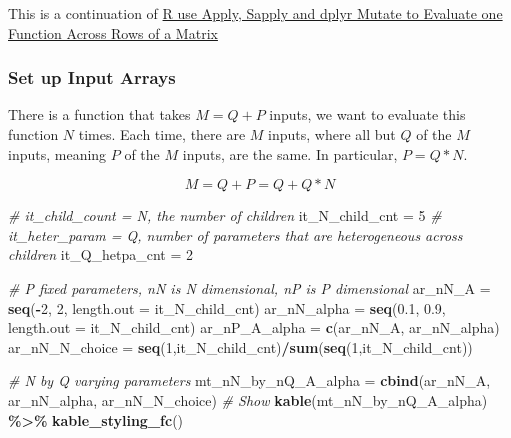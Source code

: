 \documentclass[
]{book}
\newenvironment{Shaded}{\begin{snugshade}}{\end{snugshade}}
\newcommand{\CommentTok}[1]{\textcolor[rgb]{0.56,0.35,0.01}{\textit{#1}}}
\newcommand{\DataTypeTok}[1]{\textcolor[rgb]{0.13,0.29,0.53}{#1}}
\newcommand{\DecValTok}[1]{\textcolor[rgb]{0.00,0.00,0.81}{#1}}
\newcommand{\FloatTok}[1]{\textcolor[rgb]{0.00,0.00,0.81}{#1}}
\newcommand{\KeywordTok}[1]{\textcolor[rgb]{0.13,0.29,0.53}{\textbf{#1}}}
\newcommand{\NormalTok}[1]{#1}
\newcommand{\OperatorTok}[1]{\textcolor[rgb]{0.81,0.36,0.00}{\textbf{#1}}}
\newcommand{\StringTok}[1]{\textcolor[rgb]{0.31,0.60,0.02}{#1}}
\begin{document}
This is a continuation of \href{https://fanwangecon.github.io/R4Econ/function/noloop/fs_applysapplymutate.html}{R use Apply, Sapply and dplyr Mutate to Evaluate one Function Across Rows of a Matrix}

\hypertarget{set-up-input-arrays}{%
\subsubsection{Set up Input Arrays}\label{set-up-input-arrays}}

There is a function that takes \(M=Q+P\) inputs, we want to evaluate this function \(N\) times. Each time, there are \(M\) inputs, where all but \(Q\) of the \(M\) inputs, meaning \(P\) of the \(M\) inputs, are the same. In particular, \(P=Q*N\).

\[M = Q+P = Q + Q*N\]

\begin{Shaded}
\begin{Highlighting}[]
\CommentTok{\# it\_child\_count = N, the number of children}
\NormalTok{it\_N\_child\_cnt =}\StringTok{ }\DecValTok{5}
\CommentTok{\# it\_heter\_param = Q, number of parameters that are heterogeneous across children}
\NormalTok{it\_Q\_hetpa\_cnt =}\StringTok{ }\DecValTok{2}

\CommentTok{\# P fixed parameters, nN is N dimensional, nP is P dimensional}
\NormalTok{ar\_nN\_A =}\StringTok{ }\KeywordTok{seq}\NormalTok{(}\OperatorTok{{-}}\DecValTok{2}\NormalTok{, }\DecValTok{2}\NormalTok{, }\DataTypeTok{length.out =}\NormalTok{ it\_N\_child\_cnt)}
\NormalTok{ar\_nN\_alpha =}\StringTok{ }\KeywordTok{seq}\NormalTok{(}\FloatTok{0.1}\NormalTok{, }\FloatTok{0.9}\NormalTok{, }\DataTypeTok{length.out =}\NormalTok{ it\_N\_child\_cnt)}
\NormalTok{ar\_nP\_A\_alpha =}\StringTok{ }\KeywordTok{c}\NormalTok{(ar\_nN\_A, ar\_nN\_alpha)}
\NormalTok{ar\_nN\_N\_choice =}\StringTok{ }\KeywordTok{seq}\NormalTok{(}\DecValTok{1}\NormalTok{,it\_N\_child\_cnt)}\OperatorTok{/}\KeywordTok{sum}\NormalTok{(}\KeywordTok{seq}\NormalTok{(}\DecValTok{1}\NormalTok{,it\_N\_child\_cnt))}

\CommentTok{\# N by Q varying parameters}
\NormalTok{mt\_nN\_by\_nQ\_A\_alpha =}\StringTok{ }\KeywordTok{cbind}\NormalTok{(ar\_nN\_A, ar\_nN\_alpha, ar\_nN\_N\_choice)}
\CommentTok{\# Show}
\KeywordTok{kable}\NormalTok{(mt\_nN\_by\_nQ\_A\_alpha) }\OperatorTok{\%\textgreater{}\%}
\StringTok{  }\KeywordTok{kable\_styling\_fc}\NormalTok{()}
\end{Highlighting}
\end{Shaded}
\end{document}

